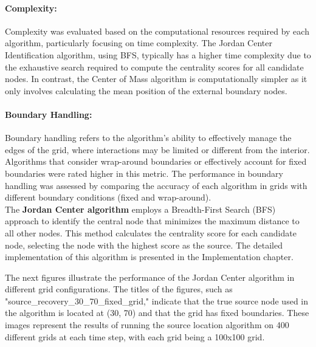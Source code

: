 \paragraph{Complexity:}
Complexity was evaluated based on the computational resources required by each algorithm, particularly focusing on time complexity. The Jordan Center Identification algorithm, using BFS, typically has a higher time complexity due to the exhaustive search required to compute the centrality scores for all candidate nodes. In contrast, the Center of Mass algorithm is computationally simpler as it only involves calculating the mean position of the external boundary nodes.

\paragraph{Boundary Handling:}
Boundary handling refers to the algorithm's ability to effectively manage the edges of the grid, where interactions may be limited or different from the interior. Algorithms that consider wrap-around boundaries or effectively account for fixed boundaries were rated higher in this metric. The performance in boundary handling was assessed by comparing the accuracy of each algorithm in grids with different boundary conditions (fixed and wrap-around).\\

The \textbf{Jordan Center algorithm} employs a Breadth-First Search (BFS) approach to identify the central node that minimizes the maximum distance to all other nodes. This method calculates the centrality score for each candidate node, selecting the node with the highest score as the source. The detailed implementation of this algorithm is presented in the Implementation chapter.

The next figures illustrate the performance of the Jordan Center algorithm in different grid configurations. The titles of the figures, such as "source\_recovery\_30\_70\_fixed\_grid," indicate that the true source node used in the algorithm is located at (30, 70) and that the grid has fixed boundaries. These images represent the results of running the source location algorithm on 400 different grids at each time step, with each grid being a 100x100 grid.

